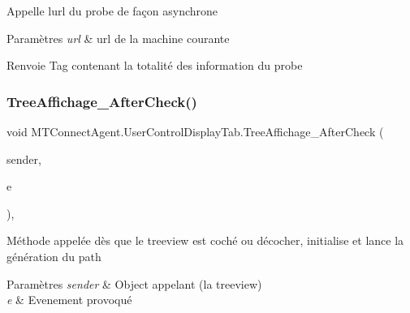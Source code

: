 Appelle l\textquotesingle{}url du probe de façon asynchrone 


\begin{DoxyParams}{Paramètres}
{\em url} & url de la machine courante\\
\hline
\end{DoxyParams}
\begin{DoxyReturn}{Renvoie}
Tag contenant la totalité des information du probe
\end{DoxyReturn}
\mbox{\label{class_m_t_connect_agent_1_1_user_control_display_tab_a867300e7d41f63cf0e728ba0f137af94}} 
\subsubsection{\texorpdfstring{Tree\+Affichage\+\_\+\+After\+Check()}{TreeAffichage\_AfterCheck()}}
{\footnotesize\ttfamily void M\+T\+Connect\+Agent.\+User\+Control\+Display\+Tab.\+Tree\+Affichage\+\_\+\+After\+Check (\begin{DoxyParamCaption}\item[{object}]{sender,  }\item[{Tree\+View\+Event\+Args}]{e }\end{DoxyParamCaption})\hspace{0.3cm}{\ttfamily [inline]}, {\ttfamily [private]}}



Méthode appelée dès que le treeview est coché ou décocher, initialise et lance la génération du path 


\begin{DoxyParams}{Paramètres}
{\em sender} & Object appelant (la treeview)\\
\hline
{\em e} & Evenement provoqué\\
\hline
\end{DoxyParams}
\mbox{\label{class_m_t_connect_agent_1_1_user_control_display_tab_abcf66374bf792fe271d968bb035d749d}} 
